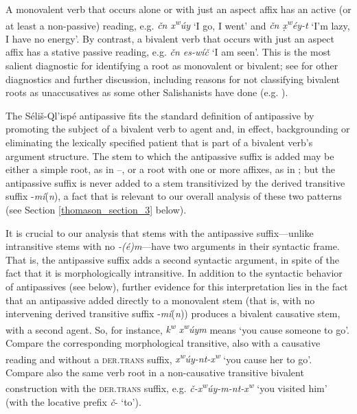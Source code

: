 \documentclass[output=paper,colorlinks,citecolor=brown]{langscibook}
\begin{document}
A monovalent verb that occurs alone or with just an aspect affix has
an active (or at least a non-passive) reading, e.g. \emph{\v{c}n
 x\textsuperscript w\'uy} `I go, I went' and \emph{\v{c}n
 \d{x}\textsuperscript w\'ey-t} `I'm lazy, I have no energy'.  By
contrast, a bivalent verb that occurs with just an aspect affix has a
stative passive reading, e.g. \emph{\v{c}n es-w\'i\v{c}} `I am seen'.
This is the most salient diagnostic for identifying a root as
monovalent or bivalent; see  for other diagnostics
and further discussion, including reasons for not classifying bivalent
roots as unaccusatives as some other Salishanists have done
(e.g. \citealt{Gerdts:1991}).


The S\'eli\v{s}-Ql'isp\'e antipassive fits the standard definition of
antipassive by promoting the subject of a bivalent verb to agent and,
in effect, backgrounding or eliminating the lexically specified
patient that is part of a bivalent verb's argument structure.  The
stem to which the antipassive suffix is added may be either a simple
root, as in --, or a root with one or more affixes, as in ; but
the antipassive suffix is never added to a stem transitivized by the
derived transitive suffix -\emph{m\'i}(\emph{n}), a fact that is
relevant to our overall analysis of these two patterns (see Section \ref{thomason_section_3}
below).


It is crucial to our analysis that stems with the antipassive
suffix---unlike intransitive stems with no \emph{-(\'e)m}---have two
arguments in their syntactic frame.  That is, the antipassive suffix
adds a second syntactic argument, in spite of the fact that it is
morphologically intransitive.  In addition to the syntactic behavior
of antipassives (see below), further evidence for this interpretation
lies in the fact that an antipassive added directly to a monovalent
stem (that is, with no intervening derived transitive suffix -\emph{m\'i}(\emph{n})) produces a bivalent causative stem, with a second
agent.  So, for instance, \emph{{k\textsuperscript w} x\textsuperscript
 w\'uym} means `you cause someone to go'.  Compare the corresponding
morphological transitive, also with a causative reading and without a
\textsc{der.trans} suffix, \emph{x\textsuperscript
 w\'uy-nt-x\textsuperscript w} `you cause her to go'.  Compare also the
same verb root in a non-causative transitive bivalent construction
with the \textsc{der.trans} suffix, e.g. \emph{\v{c}-x\textsuperscript
 w\'uy-m-nt-x\textsuperscript w} `you visited him' (with the locative
prefix \emph{\v{c}}- `to').
\end{document}
